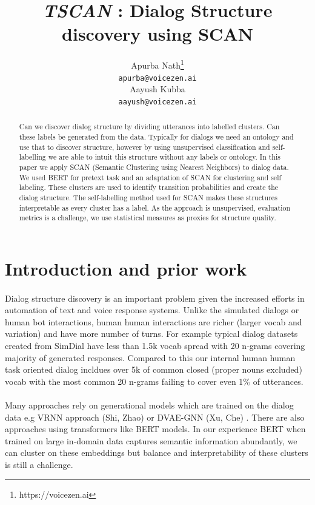 \documentclass{article}
\title{\emph{TSCAN} : Dialog Structure discovery using SCAN}
\author{ {\hspace{1mm}Apurba Nath}\thanks{https://voicezen.ai} \\
	\texttt{apurba@voicezen.ai} \\
	\And
	{\hspace{1mm}Aayush Kubba} \\
	\texttt{aayush@voicezen.ai} \\
}
\begin{document}
\maketitle

\begin{abstract}
    Can we discover dialog structure by dividing utterances into labelled clusters. Can these labels be generated from the data. Typically for dialogs we need an ontology and use that to discover structure, however by using unsupervised classification and self-labelling we are able to intuit this structure without any labels or ontology. In this paper we apply SCAN (Semantic Clustering using Nearest Neighbors) to dialog data. We used BERT for pretext task and an adaptation of SCAN for clustering and self labeling. These clusters are used to identify transition probabilities and create the dialog structure. The self-labelling method used for SCAN makes these structures interpretable as every cluster has a label. As the approach is unsupervised, evaluation metrics is a challenge, we use statistical measures as proxies for structure quality. 

\end{abstract}




\section{Introduction and prior work}

\paragraph{}
Dialog structure discovery is an important problem given the increased efforts in automation of text and voice response systems. Unlike the simulated dialogs or human bot interactions, human human interactions are richer (larger vocab and variation) and have more number of turns. For example typical dialog datasets created from SimDial have less than 1.5k vocab spread with 20 n-grams covering majority of generated responses. Compared to this our internal human human task oriented dialog incldues over 5k of common closed (proper nouns excluded) vocab with the most common 20 n-grams failing to cover even 1\% of utterances. 

\paragraph{}
Many approaches rely on generational models which are trained on the dialog data e.g VRNN approach (Shi, Zhao) \cite{qiu-etal-2020-structured}  or DVAE-GNN (Xu, Che) \cite{xu2020DDG}. There are also approaches using transformers like BERT models. In our experience BERT when trained on large in-domain data captures semantic information abundantly, we can cluster on these embeddings but balance and interpretability of these clusters is still a challenge. 
\end{document}
